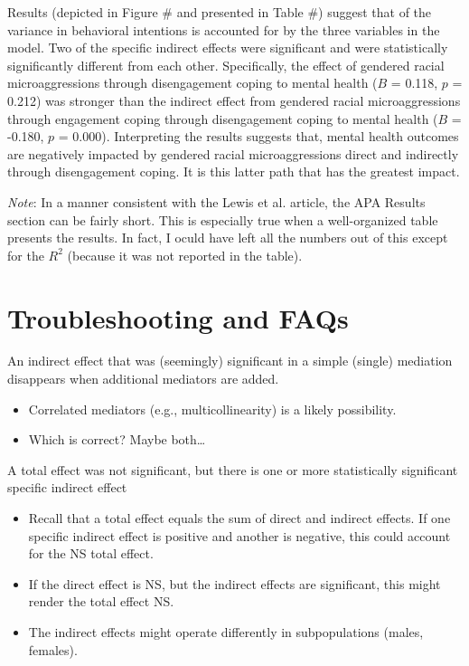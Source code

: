 \documentclass[
  11pt,
]{book}
\providecommand{\tightlist}{%
  \setlength{\itemsep}{0pt}\setlength{\parskip}{0pt}}
\begin{document}
Results (depicted in Figure \# and presented in Table \#) suggest that of the variance in behavioral intentions is accounted for by the three variables in the model. Two of the specific indirect effects were significant and were statistically significantly different from each other. Specifically, the effect of gendered racial microaggressions through disengagement coping to mental health (\(B\) = 0.118, \(p\) = 0.212) was stronger than the indirect effect from gendered racial microaggressions through engagement coping through disengagement coping to mental health (\(B\) = -0.180, \(p\) = 0.000). Interpreting the results suggests that, mental health outcomes are negatively impacted by gendered racial microaggressions direct and indirectly through disengagement coping. It is this latter path that has the greatest impact.

\emph{Note}: In a manner consistent with the Lewis et al. \citeyearpar{lewis_applying_2017} article, the APA Results section can be fairly short. This is especially true when a well-organized table presents the results. In fact, I oculd have left all the numbers out of this except for the \(R^2\) (because it was not reported in the table).

\hypertarget{troubleshooting-and-faqs}{%
\section{Troubleshooting and FAQs}\label{troubleshooting-and-faqs}}

An indirect effect that was (seemingly) significant in a simple (single) mediation disappears when additional mediators are added.

\begin{itemize}
\tightlist
\item
  Correlated mediators (e.g., multicollinearity) is a likely possibility.
\item
  Which is correct? Maybe both\ldots{}
\end{itemize}

A total effect was not significant, but there is one or more statistically significant specific indirect effect

\begin{itemize}
\tightlist
\item
  Recall that a total effect equals the sum of direct and indirect effects. If one specific indirect effect is positive and another is negative, this could account for the NS total effect.
\item
  If the direct effect is NS, but the indirect effects are significant, this might render the total effect NS.
\item
  The indirect effects might operate differently in subpopulations (males, females).
\end{itemize}
\end{document}
